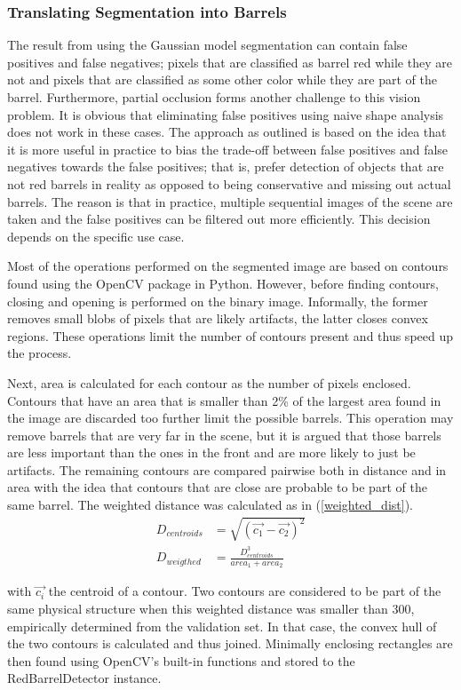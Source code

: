 \documentclass[letterpaper, 10 pt, conference]{ieeeconf}  %
\begin{document}
\subsubsection{Translating Segmentation into Barrels}
The result from using the Gaussian model segmentation can contain false positives and false negatives; pixels that are classified as barrel red while they are not and pixels that are classified as some other color while they are part of the barrel. Furthermore, partial occlusion forms another challenge to this vision problem. It is obvious that eliminating false positives using naive shape analysis does not work in these cases. The approach as outlined is based on the idea that it is more useful in practice to bias the trade-off between false positives and false negatives towards the false positives; that is, prefer detection of objects that are not red barrels in reality as opposed to being conservative and missing out actual barrels. The reason is that in practice, multiple sequential images of the scene are taken and the false positives can be filtered out more efficiently. This decision depends on the specific use case.

Most of the operations performed on the segmented image are based on contours found using the OpenCV package in Python. However, before finding contours, closing and opening is performed on the binary image. Informally, the former removes small blobs of pixels that are likely artifacts, the latter closes convex regions. These operations limit the number of contours present and thus speed up the process.

Next, area is calculated for each contour as the number of pixels enclosed. Contours that have an area that is smaller than 2\% of the largest area found in the image are discarded too further limit the possible barrels. This operation may remove barrels that are very far in the scene, but it is argued that those barrels are less important than the ones in the front and are more likely to just be artifacts. The remaining contours are compared pairwise both in distance and in area with the idea that contours that are close are probable to be part of the same barrel. The weighted distance was calculated as in (\ref{weighted_dist}).
\begin{align} \label{weighted_dist}
D_{centroids} &= \sqrt{(\vec{c_1}-\vec{c_2})^2} \\
D_{weigthed} &= \frac{D_{centroids}^3}{area_1 + area_2}
\end{align}

with $\vec{c_i}$ the centroid of a contour. Two contours are considered to be part of the same physical structure when this weighted distance was smaller than $300$, empirically determined from the validation set. In that case, the convex hull of the two contours is calculated and thus joined. Minimally enclosing rectangles are then found using OpenCV's built-in functions and stored to the RedBarrelDetector instance.
\end{document}
